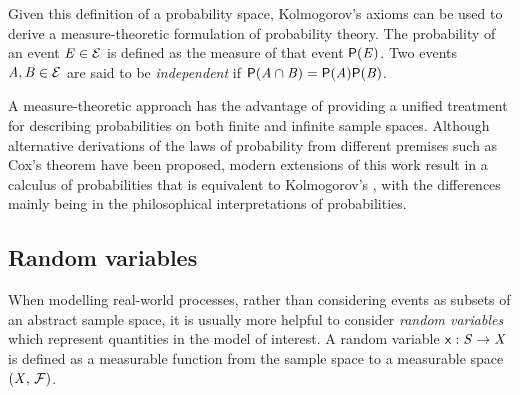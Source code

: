 Given this definition of a probability space, Kolmogorov's axioms \citep{kolmogorov1950foundations} can be used to derive a measure-theoretic formulation of probability theory. The probability of an event $\mathit{E} \in \mathcal{E}$ is defined as the measure of that event $\mathsf{P}(\mathit{E})$. Two events $\mathit{A},\mathit{B} \in \mathcal{E}$ are said to be \emph{independent} if $\mathsf{P}(\mathit{A}\cap\mathit{B}) = \mathsf{P}(\mathit{A})\mathsf{P}(\mathit{B})$.

A measure-theoretic approach has the advantage of providing a unified treatment for describing probabilities on both finite and infinite sample spaces. Although alternative derivations of the laws of probability from different premises such as Cox's theorem \citep{cox1946probability,cox1963algebra} have been proposed, modern extensions of this work result in a calculus of probabilities that is equivalent to Kolmogorov's \citep{terenin2015cox}, with the differences mainly being in the philosophical interpretations of probabilities.

\subsection{Random variables}\label{subsec:random-variables}

When modelling real-world processes, rather than considering events as subsets of an abstract sample space, it is usually more helpful to consider \emph{random variables} which represent quantities in the model of interest. A random variable $\mathsf{x} : \mathit{S} \to \mathit{X}$ is defined as a measurable function from the sample space to a measurable space $(\mathit{X},\,\mathcal{F})$. 

